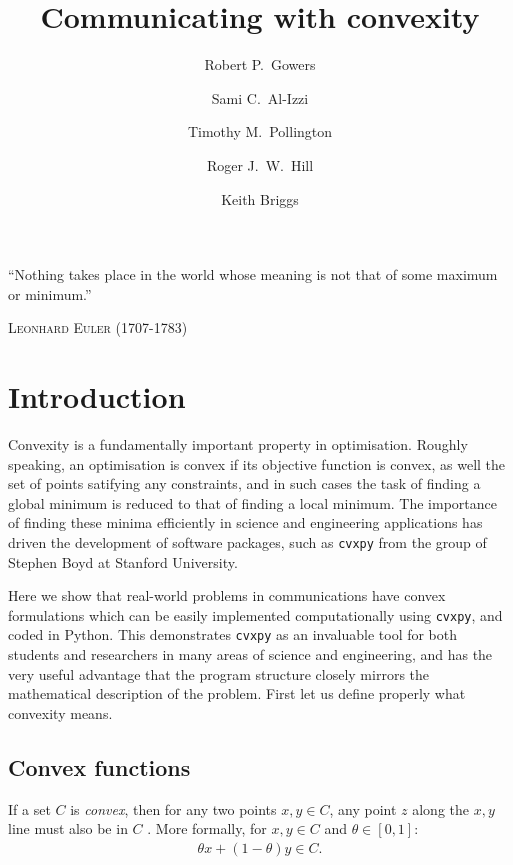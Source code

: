 \documentclass[twocolumn,secnumarabic,amssymb, nobibnotes, aps, prl,superscriptaddress]{revtex4-1}
\newcommand{\NewsItem}[1]{%
		\large #1 \vspace{4pt}
		\par \normalsize \normalfont}
\newcommand{\NewsAuthor}[1]{%
			\hfill \textsc{#1} \vspace{4pt}
			\par \normalfont}
\begin{document}

\title{Communicating with convexity}
\author{Robert P.~Gowers}%
\author{Sami C.~Al-Izzi}%
\author{Timothy M.~Pollington}%
\author{Roger J.~W.~Hill}%
\author{Keith Briggs}
\maketitle


	\NewsItem{\noindent``Nothing takes place in the world whose meaning is not that of some maximum or minimum.''}
	\NewsAuthor{Leonhard Euler (1707-1783)}
    
\section{Introduction}
\noindent Convexity is a fundamentally important property in optimisation. Roughly speaking, an optimisation is convex if its objective function is convex, as well the set of points satifying any constraints, and in such cases the task of finding a global minimum is reduced to that of finding a local minimum. The importance of finding these minima efficiently in science and engineering applications has driven the development of software packages, such as \texttt{cvxpy} from the group of Stephen Boyd at Stanford University.

Here we show that real-world problems in communications have convex formulations which can be easily implemented computationally using \texttt{cvxpy}, and coded in Python. This demonstrates \texttt{cvxpy} as an invaluable tool for both students and researchers in many areas of science and engineering, and has the very useful advantage that the program structure closely mirrors the mathematical description of the problem. First let us define properly what convexity means.

\subsection{Convex functions}
\noindent{}If a set $C$ is \textit{convex}, then for any two points $x,y\in C$, any point $z$ along the $x,y$ line must also be in $C$ \cite[p.23]{cvxpybook}. More formally, for $x,y\in C$ and $\theta\in [0,1]$:
\begin{align}
\theta x + (1-\theta)y\in C.
\end{align}
\end{document}
